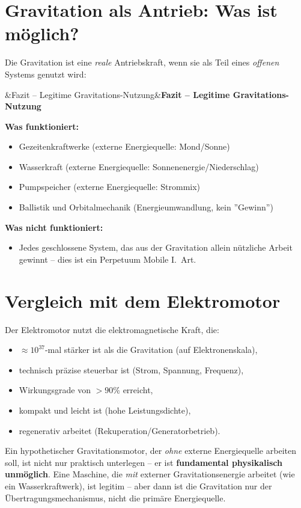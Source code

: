 ﻿\documentclass[12pt, a4paper]{report}
\newenvironment{ergebnis}[1][]{%
  \begin{ergebnisframe}\sloppy%
  \ifx&#1&\else\textbf{#1}\par\smallskip\fi}{\end{ergebnisframe}}
\theoremstyle{definition}
\theoremstyle{remark}
\begin{document}
\section{Gravitation als Antrieb: Was ist möglich?}

Die Gravitation ist eine \emph{reale} Antriebskraft, wenn sie als Teil eines
\emph{offenen} Systems genutzt wird:

\begin{ergebnis}[Fazit -- Legitime Gravitations-Nutzung]
  \textbf{Was funktioniert:}
  \begin{itemize}
    \item Gezeitenkraftwerke (externe Energiequelle: Mond/Sonne)
    \item Wasserkraft (externe Energiequelle: Sonnenenergie/Niederschlag)
    \item Pumpspeicher (externe Energiequelle: Strommix)
    \item Ballistik und Orbitalmechanik (Energieumwandlung, kein ''Gewinn'')
  \end{itemize}
  \textbf{Was nicht funktioniert:}
  \begin{itemize}
    \item Jedes geschlossene System, das aus der Gravitation allein nützliche
          Arbeit gewinnt -- dies ist ein Perpetuum Mobile I.\ Art.
  \end{itemize}
\end{ergebnis}

\section{Vergleich mit dem Elektromotor}

Der Elektromotor nutzt die elektromagnetische Kraft, die:
\begin{itemize}
  \item $\approx 10^{37}$-mal stärker ist als die Gravitation (auf Elektronenskala),
  \item technisch präzise steuerbar ist (Strom, Spannung, Frequenz),
  \item Wirkungsgrade von $>90\%$ erreicht,
  \item kompakt und leicht ist (hohe Leistungsdichte),
  \item regenerativ arbeitet (Rekuperation/Generatorbetrieb).
\end{itemize}

Ein hypothetischer Gravitationsmotor, der \emph{ohne} externe Energiequelle arbeiten
soll, ist nicht nur praktisch unterlegen -- er ist \textbf{fundamental physikalisch
unmöglich}. Eine Maschine, die \emph{mit} externer Gravitationsenergie arbeitet
(wie ein Wasserkraftwerk), ist legitim -- aber dann ist die Gravitation nur der
Übertragungsmechanismus, nicht die primäre Energiequelle.
\end{document}
